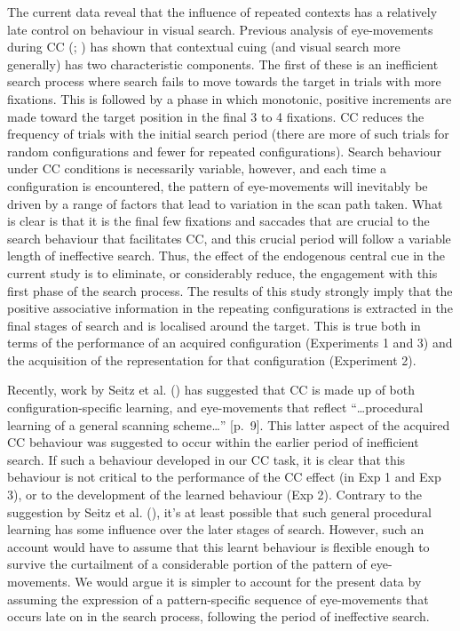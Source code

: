 \documentclass[
  man,
  floatsintext,
  longtable,
  nolmodern,
  notxfonts,
  notimes,
  colorlinks=true,linkcolor=blue,citecolor=blue,urlcolor=blue]{apa7}
\begin{document}
The current data reveal that the influence of repeated contexts has a
relatively late control on behaviour in visual search. Previous analysis
of eye-movements during CC (; ) has shown that
contextual cuing (and visual search more generally) has two
characteristic components. The first of these is an inefficient search
process where search fails to move towards the target in trials with
more fixations. This is followed by a phase in which monotonic, positive
increments are made toward the target position in the final 3 to 4
fixations. CC reduces the frequency of trials with the initial search
period (there are more of such trials for random configurations and
fewer for repeated configurations). Search behaviour under CC conditions
is necessarily variable, however, and each time a configuration is
encountered, the pattern of eye-movements will inevitably be driven by a
range of factors that lead to variation in the scan path taken. What is
clear is that it is the final few fixations and saccades that are
crucial to the search behaviour that facilitates CC, and this crucial
period will follow a variable length of ineffective search. Thus, the
effect of the endogenous central cue in the current study is to
eliminate, or considerably reduce, the engagement with this first phase
of the search process. The results of this study strongly imply that the
positive associative information in the repeating configurations is
extracted in the final stages of search and is localised around the
target. This is true both in terms of the performance of an acquired
configuration (Experiments 1 and 3) and the acquisition of the
representation for that configuration (Experiment 2).

Recently, work by Seitz et al. () has
suggested that CC is made up of both configuration-specific learning,
and eye-movements that reflect ``\ldots procedural learning of a general
scanning scheme\ldots{}'' {[}p.~9{]}. This latter aspect of the acquired
CC behaviour was suggested to occur within the earlier period of
inefficient search. If such a behaviour developed in our CC task, it is
clear that this behaviour is not critical to the performance of the CC
effect (in Exp 1 and Exp 3), or to the development of the learned
behaviour (Exp 2). Contrary to the suggestion by Seitz et al.
(), it's at least possible that such
general procedural learning has some influence over the later stages of
search. However, such an account would have to assume that this learnt
behaviour is flexible enough to survive the curtailment of a
considerable portion of the pattern of eye-movements. We would argue it
is simpler to account for the present data by assuming the expression of
a pattern-specific sequence of eye-movements that occurs late on in the
search process, following the period of ineffective search.
\end{document}
